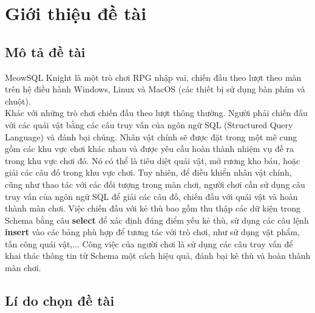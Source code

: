 \section{Giới thiệu đề tài}
\subsection{Mô tả đề tài}
	\hspace*{1cm} MeowSQL Knight là một trò chơi RPG nhập vai, chiến đấu theo lượt theo màn trên hệ điều hành Windows, Linux và MacOS (các thiết bị sử dụng bàn phím và chuột).\\
	\hspace*{1cm} Khác với những trò chơi chiến đấu theo lượt thông thường. Người phải chiến đấu với các quái vật bằng các câu truy vấn của ngôn ngữ SQL (Structured Query Language) và đánh bại chúng. Nhân vật chính sẽ được đặt trong một mê cung gồm các khu vực chơi khác nhau và được yêu cầu hoàn thành nhiệm vụ đề ra trong khu vực chơi đó. Nó có thể là tiêu diệt quái vật, mở rương kho báu, hoặc giải các câu đố trong khu vực chơi. Tuy nhiên, để
	điều khiển nhân vật chính, cũng như thao tác với các đối tượng trong màn chơi, người chơi cần sử dụng câu truy vấn của ngôn ngữ SQL để giải các câu đố, chiến đấu với quái vật và hoàn thành màn chơi. Việc chiến đấu với kẻ thù bao gồm thu thập các dữ kiện trong Schema bằng câu \textbf{select} để xác định đúng điểm yếu kẻ thù, sử dụng các câu lệnh \textbf{insert} vào các bảng phù hợp để tương tác với trò chơi, như sử dụng vật phẩm, tấn công quái vật,...  Công việc của người chơi là sử dụng các câu truy vấn để khai thác thông tin từ Schema một cách hiệu quả, đánh bại kẻ thù và hoàn thành màn chơi.
	 
\subsection{Lí do chọn đề tài}

